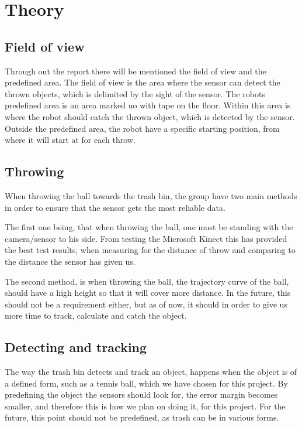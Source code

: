 \chapter{Theory}
\label{chap:Theory}

\section{Field of view}
\label{sec:Field of view}
Through out the report there will be mentioned the field of view and the predefined area. The field of view is the area where the sensor can detect the thrown objects, which is delimited by the sight of the sensor. \newline
The robots predefined area is an area marked uo with tape on the floor. Within this area is where the robot should catch the thrown object, which is detected by the sensor. Outside the predefined area, the robot have a specific starting position, from where it will start at for each throw. 

\section{Throwing}
\label{sec:ThrowingTheory}
When throwing the ball towards the trash bin, the group have two main methods in order to ensure that the sensor gets the most reliable data.

The first one being, that when throwing the ball, one must be standing with the camera/sensor to his side. From testing the Microsoft Kinect this has provided the best test results, when measuring for the distance of throw and comparing to the distance the sensor has given us.

The second method, is when throwing the ball, the trajectory curve of the ball, should have a high height so that it will cover more distance. In the future, this should not be a requirement either, but as of now, it should in order to give us more time to track, calculate and catch the object. 


\section{Detecting and tracking}
\label{sec:Detecting and trackingTheory}
The way the trash bin detects and track an object, happens when the object is of a defined form, such as a tennis ball, which we have chosen for this project. By predefining the object the sensors should look for, the error margin becomes smaller, and therefore this is how we plan on doing it, for this project. For the future, this point should not be predefined, as trash can be in various forms. 

